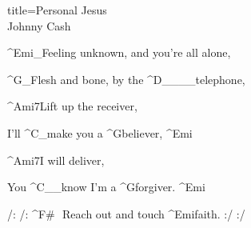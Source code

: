 \begin{song}{title=\centering Personal Jesus \\\normalsize Johnny Cash  \vspace*{-0.3cm}}
{\begin{minipage}[t]{0.48\textwidth}
\sloka
	^{Emi{\color{white}\_}}Feeling unknown, and you're all alone,

	^{G{\color{white}\_}}Flesh and bone, by the ^{D{\color{white}\_\_\_\_}}telephone,

	^{Ami7}Lift up the receiver,

	I'll ^{C{\color{white}\_}}make you a ^{G}believer, ^{Emi}

	^{Ami7}I will deliver,
	
	You ^{C{\color{white}\_\_}}know I'm a ^{G}forgiver. ^{Emi}


	/: /: ^{F\#\,\,\,\,}Reach out and touch ^{Emi}faith. :/ :/

\end{minipage}
}
\setcounter{Slokočet}{0}
\end{song}